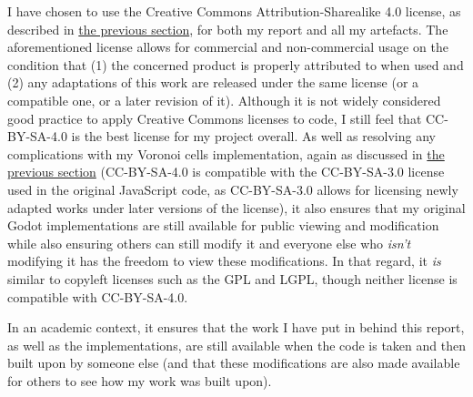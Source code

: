 I have chosen to use the Creative Commons Attribution-Sharealike 4.0 license, as described in \hyperref[howuse]{the previous section}, for both my report and all my artefacts. The aforementioned license allows for commercial and non-commercial usage on the condition that (1) the concerned product is properly attributed to when used and (2) any adaptations of this work are released under the same license (or a compatible one, or a later revision of it).\cite{cc_at_sa_3} Although it is not widely considered good practice to apply Creative Commons licenses to code, I still feel that CC-BY-SA-4.0 is the best license for my project overall. As well as resolving any complications with my Voronoi cells implementation, again as discussed in \hyperref[howuse]{the previous section} (CC-BY-SA-4.0 is compatible with the CC-BY-SA-3.0 license used in the original JavaScript code, as CC-BY-SA-3.0 allows for licensing newly adapted works under later versions of the license\cite{cc_compat}), it also ensures that my original Godot implementations are still available for public viewing and modification while also ensuring others can still modify it and everyone else who \textit{isn't} modifying it has the freedom to view these modifications. In that regard, it \textit{is} similar to copyleft licenses such as the GPL and LGPL, though neither license is compatible with CC-BY-SA-4.0.

In an academic context, it ensures that the work I have put in behind this report, as well as the implementations, are still available when the code is taken and then built upon by someone else (and that these modifications are also made available for others to see how my work was built upon).
